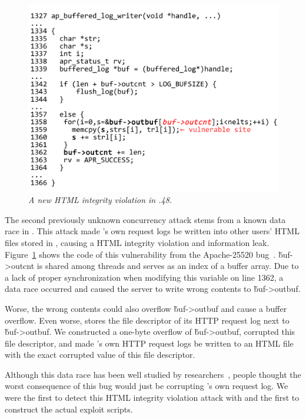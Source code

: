 \begin{figure}[h]
\centering
\vspace{-.15in}
\includegraphics[width=0.9\columnwidth]{figures/apache-25520}
\vspace{-.15in}
\caption{{\em A new HTML integrity violation in .48.}} 
\label{fig:apache-25520}
\vspace{-.1in}
\end{figure}

The second previously unknown concurrency attack stems from a known 
data race in \apache. This attack made \apache's own request logs be written 
into other users' HTML files stored in \apache, causing a HTML integrity 
violation and information leak. Figure~\ref{fig:apache-25520} shows the code of 
this vulnerability from the Apache-25520 bug~\cite{apache-bug-25520}.
\v{buf->outcnt} is shared among threads and serves as an index of a buffer
array. Due to a lack of proper synchronization when modifying this variable on
line 1362, a data race occurred and caused the server to write wrong 
contents to \v{buf->outbuf}. 

Worse, the wrong contents could also overflow \v{buf->outbuf} and cause a
buffer overflow. Even worse, \apache stores the file descriptor of its 
HTTP request log next to \v{buf->outbuf}. We constructed a one-byte 
overflow of \v{buf->outbuf}, corrupted this file descriptor, and made 
\apache's own HTTP request logs be written to an HTML file with the 
exact corrupted value of this file descriptor.

Although this data race has been well studied 
by researchers~\cite{lu:concurrency-bugs}, people thought the worst 
consequence of this bug would just be corrupting \apache's own request log. 
We were the first to detect this HTML integrity violation attack with \xxx 
and the first to construct the actual exploit scripts. 


